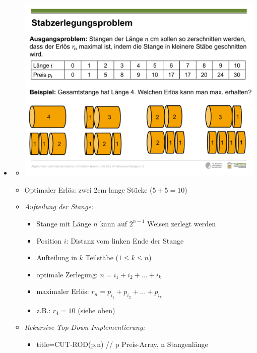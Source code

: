 \documentclass[
    12pt,
    a4paper,
    ngerman,
    color=3b,%
    marginpar=false,
    colorback=false,
    leqno,
]{tudaexercise}
\begin{document}
\begin{itemize}
        \item {}
            \begin{itemize}
                \item[] \includegraphics[width=12cm]{pictures/stabzerlegungsproblem.pdf}
                \item[] Optimaler Erlös: zwei 2cm lange Stücke ($5+5=10$) 
                \item \textit{Aufteilung der Stange:}
                    \begin{itemize}
                        \item Stange mit Länge $n$ kann auf $2^{n-1}$ Weisen zerlegt werden
                        \item Position $i$: Distanz vom linken Ende der Stange
                        \item Aufteilung in $k$ Teilstäbe ($1 \leq k \leq n$)
                        \item optimale Zerlegung: $n = i_1 + i_2 + ... + i_k$
                        \item maximaler Erlös: $r_n = p_{i_1} + p_{i_2} + ... + p_{i_k}$
                        \item z.B.: $r_4 = 10$ (siehe oben)
                    \end{itemize}
\pagebreak
                \item \textit{Rekursive Top-Down Implementierung:}
                    \begin{itemize}
                        \item[]
                            \begin{ccode}[autogobble,escapeinside=||]{title={CUT-ROD(p,n)    // p Preis-Array, n Stangenlänge}}

\end{ccode}
\end{itemize}
\end{itemize}
\end{itemize}
\end{document}
